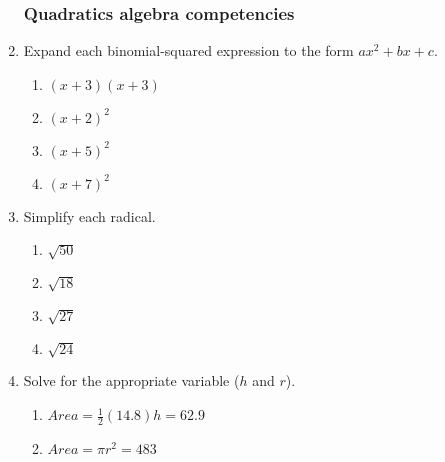 \documentclass[12pt, twoside]{article}
\begin{document}
\begin{enumerate}[itemsep=0.5cm]
\begin{multicols}{2}
\end{multicols}

\newpage
\subsubsection*{Quadratics algebra competencies} 
  
  \item Expand each binomial-squared expression to the form $ax^2+bx+c$.
  \begin{multicols}{2}
  \begin{enumerate}[itemsep=3cm]
    \item $(x+3)(x+3)$
    \item $(x+2)^2$ 
    \item $(x+5)^2$ 
    \item $(x+7)^2$ 
  \end{enumerate}
  \end{multicols}\vspace{3cm}
  
  \item Simplify each radical.
  \begin{multicols}{2}
    \begin{enumerate}[itemsep=2cm]
      \item $\sqrt{50}$ 
      \item $\sqrt{18}$
      \item $\sqrt{27}$ 
      \item $\sqrt{24}$ 
    \end{enumerate}
    \end{multicols}\vspace{2cm}
  
  \item Solve for the appropriate variable ($h$ and $r$).
    \begin{multicols}{2}
    \begin{enumerate}[itemsep=2cm]
      \item $Area=\frac{1}{2}(14.8)h=62.9$ 
      \item $Area=\pi r^2=483$ 
    \end{enumerate}
    \end{multicols}\vspace{2cm}


\end{enumerate}
\end{document}
